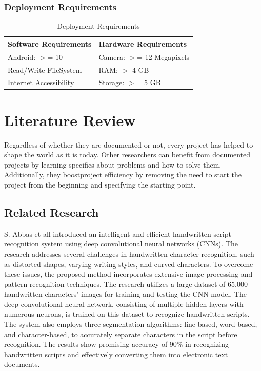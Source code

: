 \subsection{Deployment Requirements}
\begin{table}[ht]
    \centering
    \caption{Deployment Requirements}
    \begin{tabular}{|l|l|}
        \hline
        \textbf{Software Requirements} & \textbf{Hardware Requirements}\\ \hline
        Android: \(>\)= 10 & Camera: \(>\)= 12 Megapixels\\ \hline
        Read/Write FileSystem& RAM: \(>\) 4 GB\\ \hline
        Internet Accessibility & Storage: \(>\)= 5 GB\\ \hline
    \end{tabular}
\end{table}


\chapter{Literature Review}
Regardless of whether they are documented or not, every project has helped to shape the world as it is today.
Other researchers can benefit from documented projects by learning specifics about problems and how to solve
them. Additionally, they boostproject efficiency by removing the need to start the project from the beginning 
and specifying the starting point.
\section{Related Research}
S. Abbas et all introduced an intelligent and efficient handwritten script recognition system using deep
convolutional neural networks (CNNs). The research addresses several challenges in handwritten character 
recognition, such as distorted shapes, varying writing styles, and curved characters. To overcome these
issues, the proposed method incorporates extensive image processing and pattern recognition techniques.
The research utilizes a large dataset of 65,000 handwritten characters’ images for training and testing
the CNN model. The deep convolutional neural network, consisting of multiple hidden layers with numerous 
neurons, is trained on this dataset to recognize handwritten scripts. The system also employs three 
segmentation algorithms: line-based, word-based, and character-based, to accurately separate characters 
in the script before recognition. The results show promising accuracy of 90\% in recognizing handwritten 
scripts and effectively converting them into electronic text documents\cite{ghazal2022convolutional}.\\

